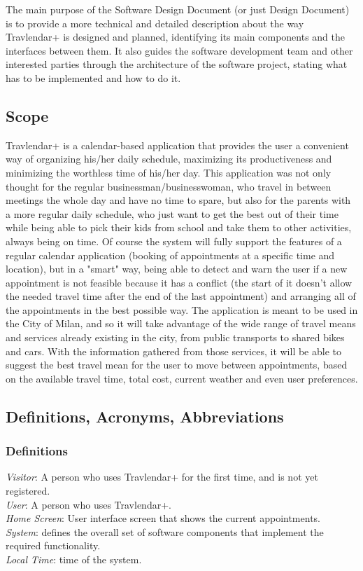 \documentclass[12pt]{article}
\begin{document}
The main purpose of the Software Design Document (or just Design Document) is to provide a more technical and detailed description about the way Travlendar+ is designed and planned, identifying its main components and the interfaces between them. It also guides the software development team and other interested parties through the architecture of the software project, stating what has to be implemented and how to do it.

\subsection{Scope}
Travlendar+ is a calendar-based application that provides the user a convenient way of organizing his/her daily schedule, maximizing its productiveness and minimizing the worthless time of his/her day. This application was not only thought for the regular businessman/businesswoman, who travel in between meetings the whole day and have no time to spare, but also for the parents with a more regular daily schedule, who just want to get the best out of their time while being able to pick their kids from school and take them to other activities, always being on time.
Of course the system will fully support the features of a regular calendar application (booking of appointments at a specific time and location), but in a "smart" way, being able to detect and warn the user if a new appointment is not feasible because it has a conflict (the start of it doesn't allow the needed travel time after the end of the last appointment) and arranging all of the appointments in the best possible way. The application is meant to be used in the City of Milan, and so it will take advantage of the wide range of travel means and services already existing in the city, from public transports to shared bikes and cars. With the information gathered from those services, it will be able to suggest the best travel mean for the user to move between appointments, based on the available travel time, total cost, current weather and even user preferences.


\subsection{Definitions, Acronyms, Abbreviations}
\subsubsection{Definitions}
\textit{Visitor}: A person who uses Travlendar+ for the first time, and is not yet registered.\\
\textit{User}: A person who uses Travlendar+.\\
\textit{Home Screen}: User interface screen that shows the current appointments.\\
\textit{System}: defines the overall set of software components that implement the required functionality.\\
\textit{Local Time}: time of the system.
\end{document}
